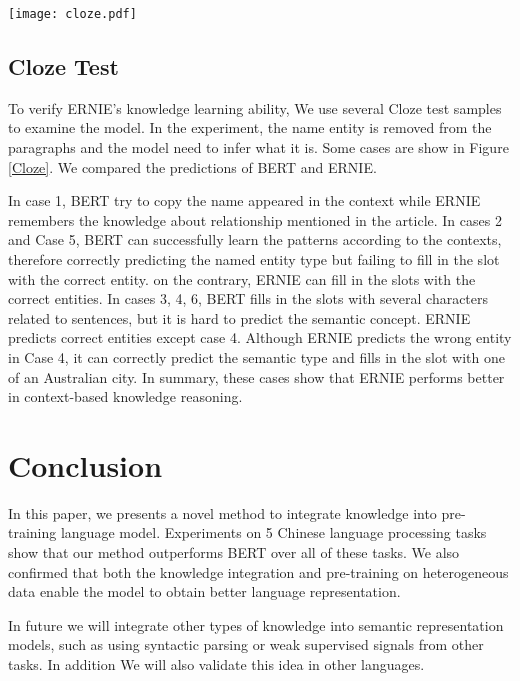 \documentclass[11pt,a4paper]{article}
\begin{document}
\begin{figure*} 
\centerline{\texttt{[image: cloze.pdf]}}
\caption{Cloze test}
\label{Cloze}

\end{figure*}

\subsection{Cloze Test}
To verify ERNIE's knowledge learning ability, We use several Cloze test samples \cite{taylor1953cloze} to examine the model. In the experiment, the name entity is removed from the paragraphs and the model need to infer what it is. Some cases are show in Figure \ref{Cloze}. We compared the predictions of BERT and ERNIE.

In case 1, BERT try to copy the name appeared in the context while ERNIE remembers the knowledge about relationship mentioned in the article. In cases 2 and Case 5, BERT can successfully learn the patterns according to the contexts, therefore correctly predicting the named entity type but failing to fill in the slot with the correct entity. on the contrary, ERNIE can fill in the slots with the correct entities. In cases 3, 4, 6, BERT fills in the slots with several characters related to sentences, but it is hard to predict the semantic concept. ERNIE predicts correct entities except case 4. Although ERNIE predicts the wrong entity in Case 4, it can correctly predict the semantic type and fills in the slot with one of an Australian city. In summary, these cases show that ERNIE performs better in context-based knowledge reasoning. 

\section{Conclusion}
In this paper, we presents a novel method to integrate knowledge into pre-training language model. Experiments on 5 Chinese language processing tasks show that our method outperforms BERT over all of these tasks. We also confirmed that both the knowledge integration and pre-training on heterogeneous data enable the model to obtain better language representation.

In future we will integrate other types of knowledge into semantic representation models, such as using syntactic parsing or weak supervised signals from other tasks. In addition We will also validate this idea in other languages.



\end{document}
